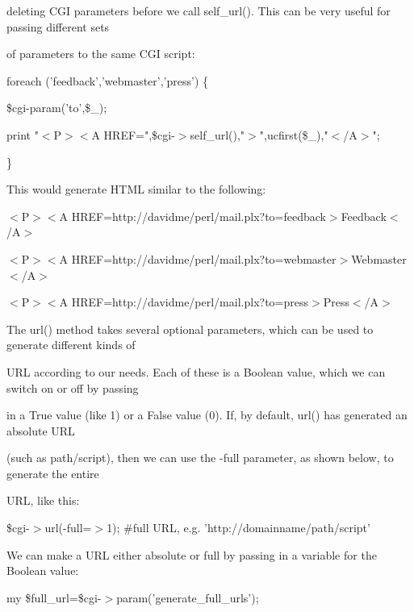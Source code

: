 \documentclass[a4paper,11pt]{book}
\begin{document}
\noindent deleting CGI parameters before we call self\_url(). This can be very useful for passing different sets

\noindent of parameters to the same CGI script:

\noindent 

\noindent 

\noindent foreach ('feedback','webmaster','press') \{

\noindent \$cgi-param('to',\$\_);

\noindent print "$<$P$>$$<$A HREF=",\$cgi-$>$self\_url(),"$>$",ucfirst(\$\_),"$<$/A$>$";

\noindent \}

\noindent 

\noindent This would generate HTML similar to the following:

\noindent 

\noindent 

\noindent $<$P$>$$<$A HREF=http://davidme/perl/mail.plx?to=feedback$>$Feedback$<$/A$>$

\noindent $<$P$>$$<$A HREF=http://davidme/perl/mail.plx?to=webmaster$>$Webmaster$<$/A$>$

\noindent $<$P$>$$<$A HREF=http://davidme/perl/mail.plx?to=press$>$Press$<$/A$>$

\noindent 

\noindent The url() method takes several optional parameters, which can be used to generate different kinds of

\noindent URL according to our needs. Each of these is a Boolean value, which we can switch on or off by passing

\noindent in a True value (like 1) or a False value (0). If, by default, url() has generated an absolute URL

\noindent (such as path/script), then we can use the -full parameter, as shown below, to generate the entire

\noindent URL, like this:

\noindent 

\noindent 

\noindent \$cgi-$>$url(-full=$>$1); \#full URL, e.g. 'http://domainname/path/script'

\noindent 

\noindent We can make a URL either absolute or full by passing in a variable for the Boolean value:

\noindent 

\noindent my \$full\_url=\$cgi-$>$param('generate\_full\_urls');
\end{document}
